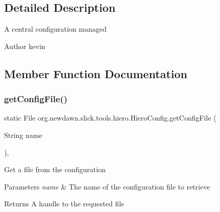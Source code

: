 \subsection{Detailed Description}
A central configuration managed

\begin{DoxyAuthor}{Author}
kevin 
\end{DoxyAuthor}


\subsection{Member Function Documentation}
\mbox{\label{classorg_1_1newdawn_1_1slick_1_1tools_1_1hiero_1_1_hiero_config_a4e8988e2077081022054edc66ff494f0}} 
\subsubsection{\texorpdfstring{get\+Config\+File()}{getConfigFile()}}
{\footnotesize\ttfamily static File org.\+newdawn.\+slick.\+tools.\+hiero.\+Hiero\+Config.\+get\+Config\+File (\begin{DoxyParamCaption}\item[{String}]{name }\end{DoxyParamCaption})\hspace{0.3cm}{\ttfamily [inline]}, {\ttfamily [static]}}

Get a file from the configuration


\begin{DoxyParams}{Parameters}
{\em name} & The name of the configuration file to retrieve \\
\hline
\end{DoxyParams}
\begin{DoxyReturn}{Returns}
A handle to the requested file 
\end{DoxyReturn}

